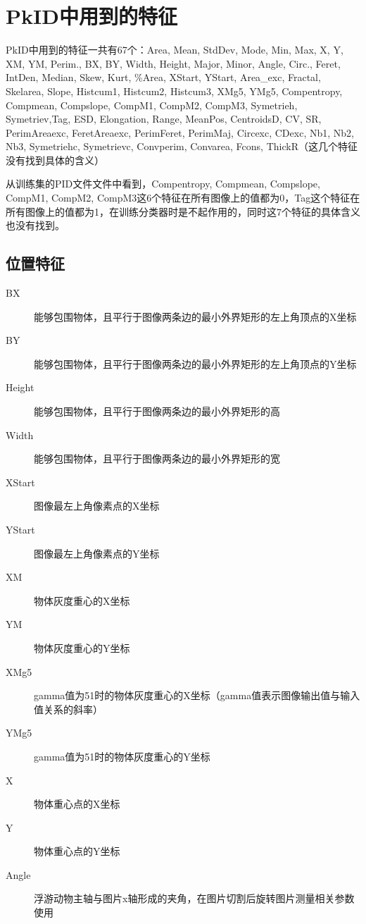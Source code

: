 \section{PkID中用到的特征}
PkID中用到的特征一共有67个：Area, Mean, StdDev, Mode, Min, Max, X, Y, XM, YM, Perim., BX, BY, Width, Height, Major, Minor, Angle, Circ., Feret, IntDen, Median, Skew, Kurt, \%Area, XStart, YStart, Area\_exc, Fractal, Skelarea, Slope, Histcum1, Histcum2, Histcum3, XMg5, YMg5, Compentropy, Compmean, Compslope, CompM1, CompM2, CompM3, Symetrieh, Symetriev,Tag, ESD, Elongation, Range, MeanPos, CentroidsD, CV, SR, PerimAreaexc, FeretAreaexc, PerimFeret, PerimMaj, Circexc, CDexc, {\color{blue}Nb1, Nb2, Nb3,  Symetriehc, Symetrievc, Convperim, Convarea, Fcons, ThickR（这几个特征没有找到具体的含义）}

从训练集的PID文件文件中看到，Compentropy, Compmean, Compslope, CompM1, CompM2, CompM3这6个特征在所有图像上的值都为0，Tag这个特征在所有图像上的值都为1，在训练分类器时是不起作用的，同时这7个特征的具体含义也没有找到。

\subsection{位置特征}
\begin{description}
\item[BX] 能够包围物体，且平行于图像两条边的最小外界矩形的左上角顶点的X坐标 
\item[BY] 能够包围物体，且平行于图像两条边的最小外界矩形的左上角顶点的Y坐标 
\item[Height] 能够包围物体，且平行于图像两条边的最小外界矩形的高
\item[Width] 能够包围物体，且平行于图像两条边的最小外界矩形的宽
\item[XStart] 图像最左上角像素点的X坐标
\item[YStart] 图像最左上角像素点的Y坐标
\item[XM] 物体灰度重心的X坐标
\item[YM] 物体灰度重心的Y坐标
\item[XMg5] gamma值为51时的物体灰度重心的X坐标（gamma值表示图像输出值与输入值关系的斜率）
\item[YMg5] gamma值为51时的物体灰度重心的Y坐标
\item[X] 物体重心点的X坐标
\item[Y] 物体重心点的Y坐标
\item[Angle] 浮游动物主轴与图片x轴形成的夹角，在图片切割后旋转图片测量相关参数使用
\end{description}

